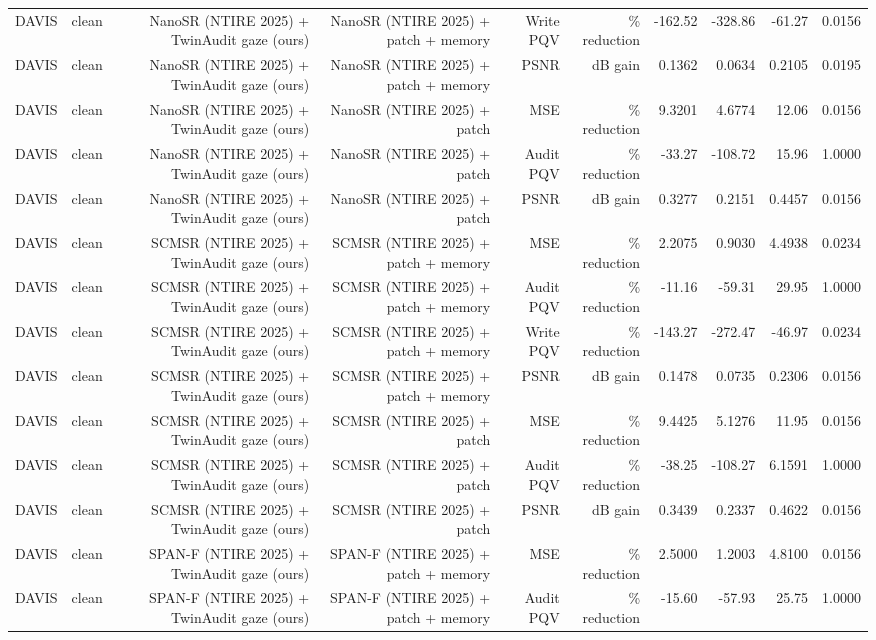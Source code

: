 \begin{table}[t]
\begin{tabular}{llrrrrrrrr}
DAVIS & clean & NanoSR (NTIRE 2025) + TwinAudit gaze (ours) & NanoSR (NTIRE 2025) + patch + memory & Write PQV & \% reduction & -162.52 & -328.86 & -61.27 & 0.0156 \\
DAVIS & clean & NanoSR (NTIRE 2025) + TwinAudit gaze (ours) & NanoSR (NTIRE 2025) + patch + memory & PSNR & dB gain & 0.1362 & 0.0634 & 0.2105 & 0.0195 \\
DAVIS & clean & NanoSR (NTIRE 2025) + TwinAudit gaze (ours) & NanoSR (NTIRE 2025) + patch & MSE & \% reduction & 9.3201 & 4.6774 & 12.06 & 0.0156 \\
DAVIS & clean & NanoSR (NTIRE 2025) + TwinAudit gaze (ours) & NanoSR (NTIRE 2025) + patch & Audit PQV & \% reduction & -33.27 & -108.72 & 15.96 & 1.0000 \\
DAVIS & clean & NanoSR (NTIRE 2025) + TwinAudit gaze (ours) & NanoSR (NTIRE 2025) + patch & PSNR & dB gain & 0.3277 & 0.2151 & 0.4457 & 0.0156 \\
DAVIS & clean & SCMSR (NTIRE 2025) + TwinAudit gaze (ours) & SCMSR (NTIRE 2025) + patch + memory & MSE & \% reduction & 2.2075 & 0.9030 & 4.4938 & 0.0234 \\
DAVIS & clean & SCMSR (NTIRE 2025) + TwinAudit gaze (ours) & SCMSR (NTIRE 2025) + patch + memory & Audit PQV & \% reduction & -11.16 & -59.31 & 29.95 & 1.0000 \\
DAVIS & clean & SCMSR (NTIRE 2025) + TwinAudit gaze (ours) & SCMSR (NTIRE 2025) + patch + memory & Write PQV & \% reduction & -143.27 & -272.47 & -46.97 & 0.0234 \\
DAVIS & clean & SCMSR (NTIRE 2025) + TwinAudit gaze (ours) & SCMSR (NTIRE 2025) + patch + memory & PSNR & dB gain & 0.1478 & 0.0735 & 0.2306 & 0.0156 \\
DAVIS & clean & SCMSR (NTIRE 2025) + TwinAudit gaze (ours) & SCMSR (NTIRE 2025) + patch & MSE & \% reduction & 9.4425 & 5.1276 & 11.95 & 0.0156 \\
DAVIS & clean & SCMSR (NTIRE 2025) + TwinAudit gaze (ours) & SCMSR (NTIRE 2025) + patch & Audit PQV & \% reduction & -38.25 & -108.27 & 6.1591 & 1.0000 \\
DAVIS & clean & SCMSR (NTIRE 2025) + TwinAudit gaze (ours) & SCMSR (NTIRE 2025) + patch & PSNR & dB gain & 0.3439 & 0.2337 & 0.4622 & 0.0156 \\
DAVIS & clean & SPAN-F (NTIRE 2025) + TwinAudit gaze (ours) & SPAN-F (NTIRE 2025) + patch + memory & MSE & \% reduction & 2.5000 & 1.2003 & 4.8100 & 0.0156 \\
DAVIS & clean & SPAN-F (NTIRE 2025) + TwinAudit gaze (ours) & SPAN-F (NTIRE 2025) + patch + memory & Audit PQV & \% reduction & -15.60 & -57.93 & 25.75 & 1.0000 \\

\end{tabular}
\end{table}
